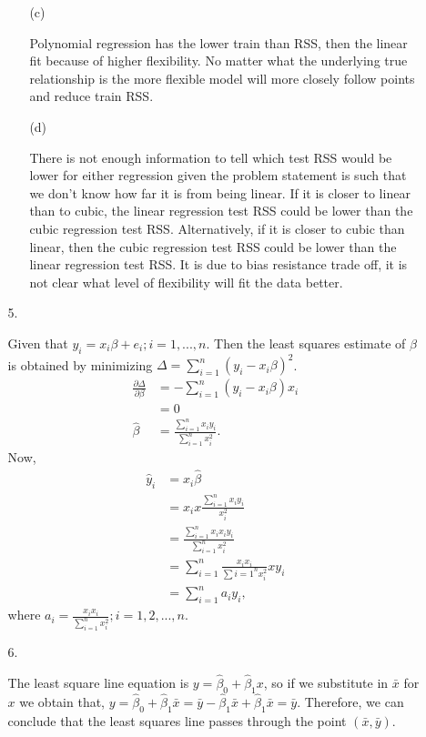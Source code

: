 \documentclass{article}
\begin{document}
\begin{enumerate}
\begin{enumerate}
\begin{enumerate}
            \item [(c)]
            
            Polynomial regression has the lower train than RSS, then the linear fit because of higher flexibility. No matter what the underlying true relationship is the more flexible model will more closely follow points and reduce train RSS.
            
            \item [(d)]
            
            There is not enough information to tell which test RSS would be lower for either regression given the problem statement is such that we don't know how far it is from being linear. If it is closer to linear than to cubic, the linear regression test RSS could be lower than the cubic regression test RSS. Alternatively, if it is closer to cubic than linear, then the cubic regression test RSS could be lower than the linear regression test RSS. It is due to bias resistance trade off, it is not clear what level of flexibility will fit the data better.
            
        \end{enumerate}
        
        \item[5. ]
        
        Given that $y_i = x_i\beta + e_i; i =1, ..., n$. Then the least squares estimate of $\beta$ is obtained by minimizing $\Delta = \sum_{i =1}^n(y_i-x_i\beta)^2$. 
        \begin{align*}
            \frac{\partial \Delta}{\partial \beta} &= -\sum_{i=1}^n(y_i-x_i\beta)x_i\\
            &= 0\\
            \hat{\beta} &= \frac{\sum_{i=1}^nx_iy_i}{\sum_{i=1}^nx_i^2}.
        \end{align*} Now, 
        \begin{align*}
            \hat{y}_i &= x_i\hat{\beta}\\
            &= x_ix\frac{\sum_{i=1}^nx_iy_i}{x_i^2}\\
            &= \frac{\sum_{i=1}^nx_ix_iy_i}{\sum_{i=1}^nx_i^2}\\
            &= \sum_{i=1}^n \frac{x_ix_i}{\sum{i=1}^nx_i^2}xy_i\\
            &= \sum_{i=1}^na_iy_i,
        \end{align*} where $a_i = \frac{x_ix_i}{\sum_{i=1}^nx_i^2}; i=1,2,...,n.$
        
        \item[6. ]
        
        The least square line equation is $y = \hat{\beta}_0 + \hat{\beta}_1x$, so if we substitute in $\bar{x}$ for $x$ we obtain that, $y = \hat{\beta}_0 + \hat{\beta}_1\bar{x} = \bar{y}-\hat{\beta}_1\bar{x}+\hat{\beta}_1\bar{x}=\bar{y}$. Therefore, we can conclude that the least squares line passes through the point $(\bar{x},\bar{y}).$
        
    \end{enumerate}
    
\end{enumerate}
\end{document}
